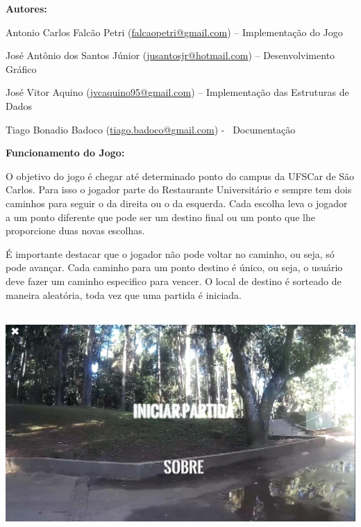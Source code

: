 \documentclass[a4paper]{article}
\begin{document}
{\color{black}
\textbf{Autores:}}

{\color{black}
Antonio Carlos Falcão Petri
(\href{mailto:falcaopetri@gmail.com}{falcaopetri}\href{mailto:falcaopetri@gmail.com}{@}\href{mailto:falcaopetri@gmail.com}{gmail}\href{mailto:falcaopetri@gmail.com}{.}\href{mailto:falcaopetri@gmail.com}{com})
– Implementação do Jogo}

{\color{black}
José Antônio dos Santos Júnior
(\href{mailto:jusantosjr@hotmail.com}{jusantosjr}\href{mailto:jusantosjr@hotmail.com}{@}\href{mailto:jusantosjr@hotmail.com}{hotmail}\href{mailto:jusantosjr@hotmail.com}{.}\href{mailto:jusantosjr@hotmail.com}{com})
– Desenvolvimento Gráfico}

{\color{black}
José Vitor Aquino
(\href{mailto:jvcaquino95@gmail.com}{jvcaquino}\href{mailto:jvcaquino95@gmail.com}{95@}\href{mailto:jvcaquino95@gmail.com}{gmail}\href{mailto:jvcaquino95@gmail.com}{.}\href{mailto:jvcaquino95@gmail.com}{com})
– Implementação das Estruturas de Dados}

{\color{black}
Tiago Bonadio Badoco
(\href{mailto:tiago.badoco@gmail.com}{tiago}\href{mailto:tiago.badoco@gmail.com}{.}\href{mailto:tiago.badoco@gmail.com}{badoco}\href{mailto:tiago.badoco@gmail.com}{@}\href{mailto:tiago.badoco@gmail.com}{gmail}\href{mailto:tiago.badoco@gmail.com}{.}\href{mailto:tiago.badoco@gmail.com}{com})
- \ Documentação}


\bigskip

{\color{black}
\textbf{Funcionamento do Jogo:}}

{\color{black}
O objetivo do jogo é chegar até determinado ponto do campus da UFSCar de
São Carlos. Para isso o jogador parte do Restaurante Universitário e
sempre tem dois caminhos para seguir o da direita ou o da esquerda.
Cada escolha leva o jogador a um ponto diferente que pode ser um
destino final ou um ponto que lhe proporcione duas novas escolhas.}

{\color{black}
É importante destacar que o jogador não pode voltar no caminho, ou seja,
só pode avançar. Cada caminho para um ponto destino é único, ou seja, o
usuário deve fazer um caminho especifico para vencer. O local de
destino é sorteado de maneira aleatória, toda vez que uma partida é
iniciada.}


\includegraphics[width=5.9165in,height=3.3335in]{UFSCar20Summer20Tour-img/UFSCar20Summer20Tour-img2.png}
\end{document}

